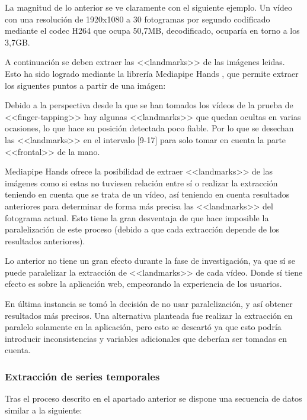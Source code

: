 La magnitud de lo anterior se ve claramente con el siguiente ejemplo. Un vídeo
con una resolución de 1920x1080 a 30 fotogramas por segundo codificado mediante
el codec H264 que ocupa 50,7MB, decodificado, ocuparía en torno a los 3,7GB.

A continuación se deben extraer las <<landmarks>> de las imágenes leidas. Esto
ha sido logrado mediante la librería Mediapipe Hands \cite{zhang2020mediapipe},
que permite extraer los siguentes puntos a partir de una imágen:


Debido a la perspectiva desde la que se han tomados los vídeos de la prueba de
<<finger-tapping>> hay algunas <<landmarks>> que quedan ocultas en varias
ocasiones, lo que hace su posición detectada poco fiable. Por lo que se desechan
las <<landmarks>> en el intervalo [9-17] para solo tomar en cuenta la parte
<<frontal>> de la mano.

Mediapipe Hands ofrece la posibilidad de extraer <<landmarks>> de las imágenes
como si estas no tuviesen relación entre sí o realizar la extracción teniendo en
cuenta que se trata de un vídeo, así teniendo en cuenta resultados anteriores
para determinar de forma más precisa las <<landmarks>> del fotograma actual.
Esto tiene la gran desventaja de que hace imposible la paralelización de este
proceso (debido a que cada extracción depende de los resultados anteriores).

Lo anterior no tiene un gran efecto durante la fase de investigación, ya que sí
se puede paralelizar la extracción de <<landmarks>> de cada vídeo. Donde sí
tiene efecto es sobre la aplicación web, empeorando la experiencia de los
usuarios.

En última instancia se tomó la decisión de no usar paralelización, y así obtener
resultados más precisos. Una alternativa planteada fue realizar la extracción en
paralelo solamente en la aplicación, pero esto se descartó ya que esto podría
introducir inconsistencias y variables adicionales que deberían ser tomadas en
cuenta.

\subsubsection{Extracción de series temporales}

Tras el proceso descrito en el apartado anterior se dispone una secuencia de
datos similar a la siguiente:


